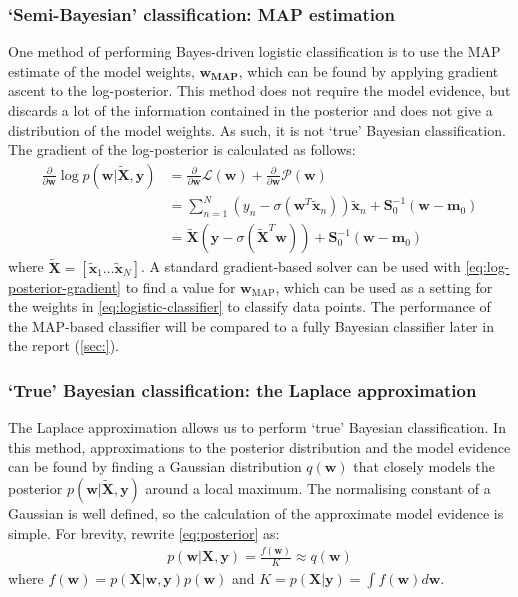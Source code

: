 \documentclass[a4paper]{article}
\begin{document}
    \subsubsection{`Semi-Bayesian' classification: MAP estimation}
    One method of performing Bayes-driven logistic classification is to use the MAP estimate of the model weights, $\bm{w_\text{MAP}}$, which can be found by applying gradient ascent to the log-posterior.
    This method does not require the model evidence, but discards a lot of the information contained in the posterior and does not give a distribution of the model weights.
    As such, it is not `true' Bayesian classification.
    The gradient of the log-posterior is calculated as follows:
    \begin{align}
        \frac{\partial}{\partial \bm{w}} \log p(\bm{w} | \tilde{\bm{X}}, \bm{y}) &= \frac{\partial}{\partial \bm{w}} \mathcal{L}(\bm{w}) + \frac{\partial}{\partial \bm{w}} \mathcal{P}(\bm{w}) \nonumber \\
        &= \sum_{n=1}^{N} \left(y_n - \sigma(\bm{w}^T \tilde{\bm{x}}_n) \right)  \tilde{\bm{x}}_n  + \bm{S}_0^{-1}(\bm{w} - \bm{m}_0) \nonumber \\
        &= \tilde{\bm{X}} (\textbf{y} - \sigma(\tilde{\bm{X}}^T \bm{w})) +  \bm{S}_0^{-1}(\bm{w} - \bm{m}_0)
        \label{eq:log-posterior-gradient}
    \end{align}
    where $\tilde{\bm{X}} = [\tilde{\bm{x}}_1 \dots \tilde{\bm{x}}_N]$.
    A standard gradient-based solver can be used with \autoref{eq:log-posterior-gradient} to find a value for $\bm{w}_\text{MAP}$, which can be used as a setting for the weights in \autoref{eq:logistic-classifier} to classify data points.
    The performance of the MAP-based classifier will be compared to a fully Bayesian classifier later in the report (\autoref{sec:}).

    \subsubsection{`True' Bayesian classification: the Laplace approximation}
    The Laplace approximation allows us to perform `true' Bayesian classification.
    In this method, approximations to the posterior distribution and the model evidence can be found by finding a Gaussian distribution $q(\bm{w})$ that closely models the posterior $p(\bm{w} | \tilde{\bm{X}}, \bm{y})$ around a local maximum.
    The normalising constant of a Gaussian is well defined, so the calculation of the approximate model evidence is simple.
    For brevity, rewrite \autoref{eq:posterior} as:
    \begin{align}
        p(\bm{w} | \bm{X}, \bm{y}) = \frac{f(\bm{w})}{K} \approx q(\bm{w}) \nonumber
    \end{align}
    where $f(\bm{w}) = p(\bm{X} | \bm{w}, \bm{y}) p(\bm{w})$ and $K = p(\bm{X} | \bm{y}) = \int f(\bm{w}) d\bm{w}$.
\end{document}
